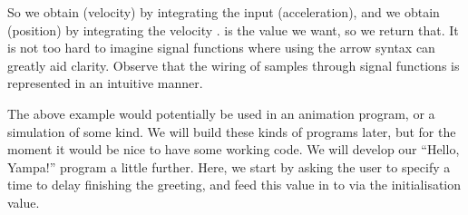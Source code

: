 \noindent So we obtain  (velocity) by integrating the input  (acceleration), and we obtain  (position) by integrating the velocity .  is the value we want, so we return that. It is not too hard to imagine signal functions where using the arrow syntax can greatly aid clarity. Observe that the wiring of samples through signal functions is represented in an intuitive manner.

The above example would potentially be used in an animation program, or a simulation of some kind. We will build these kinds of programs later, but for the moment it would be nice to have some working code. We will develop our ``Hello, Yampa!'' program a little further. Here, we start by asking the user to specify a time to delay finishing the greeting, and feed this value in to \yampaMain via the initialisation value.


